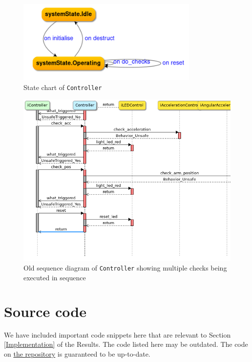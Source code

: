 \documentclass[12pt]{scrreprt}
\begin{document}
\begin{appendices}
\begin{figure}[H]
    \centering
    \includegraphics[width=0.8\textwidth]{Figures/results/modelling_figures/Controller/Controller_state_chart.png}
    \caption{State chart of \texttt{Controller}}
    \label{fig:controll_old}
\end{figure}


\begin{figure}[H]
    \centering
    \includegraphics[width=\textwidth]{Figures/results/modelling_figures/Controller/old_Controller_seq.png}
    \caption{Old sequence diagram of \texttt{Controller} showing multiple checks being executed in sequence}
    \label{fig:controll_old}
\end{figure}



\chapter{Source code}
We have included important code snippets here that are relevant to Section \ref{Implementation} of the Results. The code listed here may be outdated. The code on \href{https://github.com/Yousousen/safety-module-for-care-robot-rose}{the repository} is guaranteed to be up-to-date.


\end{appendices}
\end{document}
